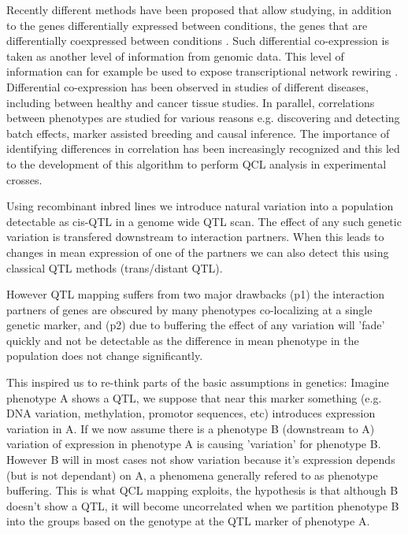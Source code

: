 \documentclass[12pt]{article}
\begin{document}
  Recently different methods have been proposed that allow studying, in addition to the genes 
  differentially expressed between conditions, the genes that are differentially coexpressed 
  between conditions \cite{Tesson:2010,Kompass:2011}. Such differential co-expression 
  is taken as another level of information from genomic data. This level of information can for 
  example be used to expose transcriptional network rewiring \cite{Langfelder:2008}. Differential 
  co-expression has been observed in studies of different diseases, including between healthy and 
  cancer tissue studies. In parallel, correlations between phenotypes are studied for various 
  reasons e.g. discovering and detecting batch effects, marker assisted breeding and causal 
  inference. The importance of identifying differences in correlation has been increasingly 
  recognized and this led to the development of this algorithm to perform QCL analysis in 
  experimental crosses.

  Using recombinant inbred lines we introduce natural variation into a population 
  detectable as cis-QTL in a genome wide QTL scan. The effect of any such genetic 
  variation is transfered downstream to interaction partners. When this leads to 
  changes in mean expression of one of the partners we can also detect this using 
  classical QTL methods (trans/distant QTL). 

  However QTL mapping suffers from two major drawbacks (p1) the interaction partners 
  of genes are obscured by many phenotypes co-localizing at a single genetic marker, and 
  (p2) due to buffering the effect of any variation will 'fade' quickly and not be 
  detectable as the difference in mean phenotype in the population does not change 
  significantly.

  This inspired us to re-think parts of the basic assumptions in genetics:
  Imagine phenotype A shows a QTL, we suppose that near this marker something (e.g. DNA variation, 
  methylation, promotor sequences, etc) introduces expression variation in A. If we now assume there is a 
  phenotype B (downstream to A) variation of expression in phenotype A is causing 'variation' 
  for phenotype B. However B will in most cases not show variation because it's expression 
  depends (but is not dependant) on A, a phenomena generally refered to as phenotype buffering. 
  This is what QCL mapping exploits, the hypothesis is that although B doesn't show a QTL, 
  it will become uncorrelated when we partition phenotype B into the groups based on the genotype at 
  the QTL marker of phenotype A. 
\end{document}
